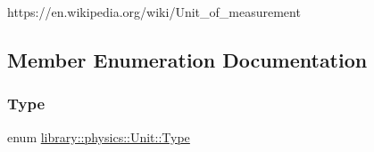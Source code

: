 https\+://en.wikipedia.\+org/wiki/\+Unit\+\_\+of\+\_\+measurement 

\subsection{Member Enumeration Documentation}
\mbox{\label{classlibrary_1_1physics_1_1_unit_ab01b0024991fd80f3e5ef7c8282fccc1}} 
\subsubsection{\texorpdfstring{Type}{Type}}
{\footnotesize\ttfamily enum \hyperlink{classlibrary_1_1physics_1_1_unit_ab01b0024991fd80f3e5ef7c8282fccc1}{library\+::physics\+::\+Unit\+::\+Type}\hspace{0.3cm}{\ttfamily [strong]}}


